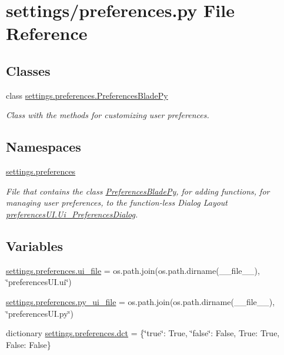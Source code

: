 \hypertarget{a00029}{}\section{settings/preferences.py File Reference}
\label{a00029}
\subsection*{Classes}
\begin{DoxyCompactItemize}
\item 
class \hyperlink{a00102}{settings.\+preferences.\+Preferences\+Blade\+Py}
\begin{DoxyCompactList}\small\item\em Class with the methods for customizing user preferences. \end{DoxyCompactList}\end{DoxyCompactItemize}
\subsection*{Namespaces}
\begin{DoxyCompactItemize}
\item 
 \hyperlink{a00059}{settings.\+preferences}
\begin{DoxyCompactList}\small\item\em File that contains the class \hyperlink{a00102}{Preferences\+Blade\+Py}, for adding functions, for managing user preferences, to the function-\/less Dialog Layout \hyperlink{a00106}{preferences\+U\+I.\+Ui\+\_\+\+Preferences\+Dialog}. \end{DoxyCompactList}\end{DoxyCompactItemize}
\subsection*{Variables}
\begin{DoxyCompactItemize}
\item 
\hyperlink{a00059_a033eb50e8b7b2de7816c6e423cf89fa2}{settings.\+preferences.\+ui\+\_\+file} = os.\+path.\+join(os.\+path.\+dirname(\+\_\+\+\_\+file\+\_\+\+\_\+), \char`\"{}preferences\+U\+I.\+ui\char`\"{})
\item 
\hyperlink{a00059_ae7e022019493035187806fac02749517}{settings.\+preferences.\+py\+\_\+ui\+\_\+file} = os.\+path.\+join(os.\+path.\+dirname(\+\_\+\+\_\+file\+\_\+\+\_\+), \char`\"{}preferences\+U\+I.\+py\char`\"{})
\item 
dictionary \hyperlink{a00059_a733f21e501f603b086934c865c62d41d}{settings.\+preferences.\+dct} = \{\char`\"{}true\char`\"{}\+: True, \char`\"{}false\char`\"{}\+: False, True\+: True, False\+: False\}
\end{DoxyCompactItemize}
